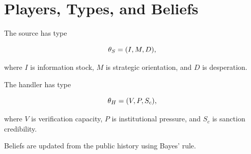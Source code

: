 \section{Players, Types, and Beliefs}

The source has type


\[
\theta_S = (I, M, D),
\]


where $I$ is information stock, $M$ is strategic orientation, and $D$ is
desperation.

The handler has type


\[
\theta_H = (V, P, S_c),
\]


where $V$ is verification capacity, $P$ is institutional pressure, and
$S_c$ is sanction credibility.

Beliefs are updated from the public history using Bayes' rule.
